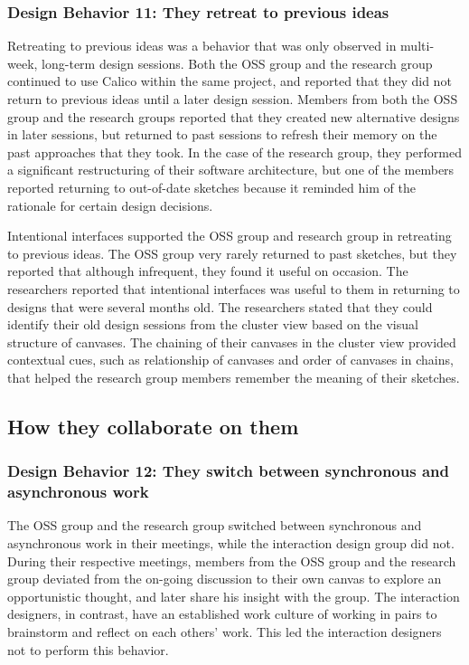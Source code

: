 \subsubsection{Design Behavior 11: They retreat to previous ideas}

Retreating to previous ideas was a behavior that was only observed in multi-week, long-term design sessions. Both the OSS group and the research group  continued to use Calico within the same project, and reported that they did not return to previous ideas until a later design session. Members from both the OSS group and the research groups reported that they created new alternative designs in later sessions, but returned to past sessions to refresh their memory on the past approaches that they took. In the case of the research group, they performed a significant restructuring of their software architecture, but one of the members reported returning to out-of-date sketches because it reminded him of the rationale for certain design decisions.

Intentional interfaces supported the OSS group and research group in retreating to previous ideas. The OSS group very rarely returned to past sketches, but they reported that although infrequent, they found it useful on occasion. The researchers reported that intentional interfaces was useful to them in returning to designs that were several months old. The researchers stated that they could identify their old design sessions from the cluster view based on the visual structure of canvases. The chaining of their canvases in the cluster view provided contextual cues, such as relationship of canvases and order of canvases in chains, that helped the research group members remember the meaning of their sketches. 

\subsection{How they collaborate on them}

\subsubsection{Design Behavior 12: They switch between synchronous and asynchronous work}

The OSS group and the research group switched between synchronous and asynchronous work in their meetings, while the interaction design group did not. During their respective meetings, members from the OSS group and the research group deviated from the on-going discussion to their own canvas to explore an opportunistic thought, and later share his insight with the group. The interaction designers, in contrast, have an established work culture of working in pairs to brainstorm and reflect on each others' work. This led the interaction designers not to perform this behavior.

